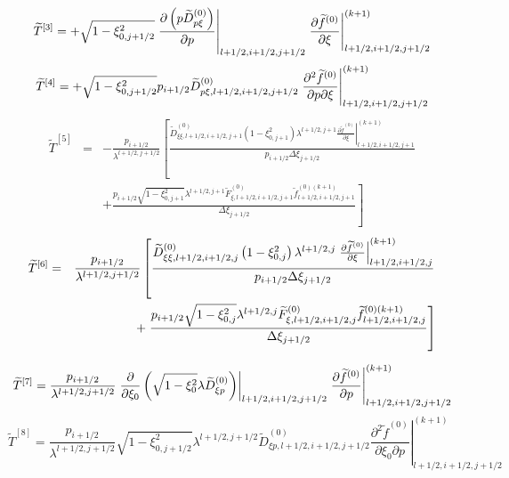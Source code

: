 \begin{equation}
\widetilde{T}^{\left[ 3\right] }=+\sqrt{1-\xi _{0,j+1/2}^{2}}\left. \frac{%
\partial \left( p\widetilde{D}_{p\xi }^{\left( 0\right) }\right) }{\partial p%
}\right| _{l+1/2,i+1/2,j+1/2}\left. \frac{\partial \widetilde{f}^{\left(
0\right) }}{\partial \xi }\right| _{l+1/2,i+1/2,j+1/2}^{(k+1)}
\end{equation}
\begin{equation}
\widetilde{T}^{\left[ 4\right] }=+\sqrt{1-\xi _{0,j+1/2}^{2}}p_{i+1/2}%
\widetilde{D}_{p\xi ,l+1/2,i+1/2,j+1/2}^{\left( 0\right) }\left. \frac{%
\partial ^{2}\widetilde{f}^{\left( 0\right) }}{\partial p\partial \xi }%
\right| _{l+1/2,i+1/2,j+1/2}^{(k+1)}
\end{equation}
\begin{eqnarray}
\widetilde{T}^{\left[ 5\right] } &=&-\frac{p_{i+1/2}}{\lambda ^{l+1/2,j+1/2}}%
\left[ \frac{\widetilde{D}_{\xi \xi ,l+1/2,i+1/2,j+1}^{\left( 0\right)
}\left( 1-\xi _{0,j+1}^{2}\right) \lambda ^{l+1/2,j+1}\left. \frac{\partial
\widetilde{f}^{\left( 0\right) }}{\partial \xi }\right|
_{l+1/2,i+1/2,j+1}^{(k+1)}}{p_{i+1/2}\Delta \xi _{j+1/2}}\right.   \nonumber
\\
&&+\left. \frac{p_{i+1/2}\sqrt{1-\xi _{0,j+1}^{2}}\lambda ^{l+1/2,j+1}%
\widetilde{F}_{\xi ,l+1/2,i+1/2,j+1}^{\left( 0\right) }\widetilde{f}%
_{l+1/2,i+1/2,j+1}^{\left( 0\right) (k+1)}}{\Delta \xi _{j+1/2}}\right]
\end{eqnarray}
\begin{eqnarray}
\widetilde{T}^{\left[ 6\right] } &=&\frac{p_{i+1/2}}{\lambda ^{l+1/2,j+1/2}}%
\left[ \frac{\widetilde{D}_{\xi \xi ,l+1/2,i+1/2,j}^{\left( 0\right) }\left(
1-\xi _{0,j}^{2}\right) \lambda ^{l+1/2,j}\left. \frac{\partial \widetilde{f}%
^{\left( 0\right) }}{\partial \xi }\right| _{l+1/2,i+1/2,j}^{(k+1)}}{%
p_{i+1/2}\Delta \xi _{j+1/2}}\right.   \nonumber \\
&&+\left. \frac{p_{i+1/2}\sqrt{1-\xi _{0,j}^{2}}\lambda ^{l+1/2,j}\widetilde{%
F}_{\xi ,l+1/2,i+1/2,j}^{\left( 0\right) }\widetilde{f}_{l+1/2,i+1/2,j}^{%
\left( 0\right) (k+1)}}{\Delta \xi _{j+1/2}}\right]
\end{eqnarray}

\begin{equation}
\widetilde{T}^{\left[ 7\right] }=\frac{p_{i+1/2}}{\lambda ^{l+1/2,j+1/2}}%
\left. \frac{\partial }{\partial \xi _{0}}\left( \sqrt{1-\xi _{0}^{2}}%
\lambda \widetilde{D}_{\xi p}^{\left( 0\right) }\right) \right|
_{l+1/2,i+1/2,j+1/2}\left. \frac{\partial \widetilde{f}^{\left( 0\right) }}{%
\partial p}\right| _{l+1/2,i+1/2,j+1/2}^{(k+1)}
\end{equation}
\begin{equation}
\widetilde{T}^{\left[ 8\right] }=\frac{p_{i+1/2}}{\lambda ^{l+1/2,j+1/2}}%
\sqrt{1-\xi _{0,j+1/2}^{2}}\lambda ^{l+1/2,j+1/2}\widetilde{D}_{\xi
p,l+1/2,i+1/2,j+1/2}^{\left( 0\right) }\left. \frac{\partial ^{2}\widetilde{f%
}^{\left( 0\right) }}{\partial \xi _{0}\partial p}\right|
_{l+1/2,i+1/2,j+1/2}^{(k+1)}
\end{equation}

